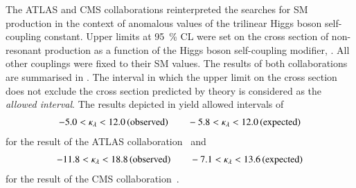 The ATLAS and CMS collaborations reinterpreted the searches for SM \HH
production in the context of anomalous values of the trilinear Higgs boson
self-coupling constant. Upper limits at \SI{95}{\percent} CL were set on the
cross section of non-resonant \HH production as a function of the Higgs boson
self-coupling modifier, \klambda. All other couplings were fixed to their SM
values. The results of both collaborations are summarised in
. The \klambda interval in which the upper limit
on the cross section does not exclude the cross section predicted by theory is
considered as the \emph{allowed \klambda interval}. The results depicted in
 yield allowed \klambda intervals of
\begin{align*}
  -5.0 < \kappa_{\lambda} < 12.0 \,\text{(observed)} \qquad -5.8 < \kappa_{\lambda} < 12.0 \,\text{(expected)}
\end{align*}
for the result of the ATLAS collaboration~\cite{HDBS-2018-58} and
\begin{align*}
  -11.8 < \kappa_{\lambda} < 18.8 \,\text{(observed)} \qquad -7.1 < \kappa_{\lambda} < 13.6 \,\text{(expected)}
\end{align*}
for the result of the CMS collaboration~\cite{CMS-HIG-17-030}.

